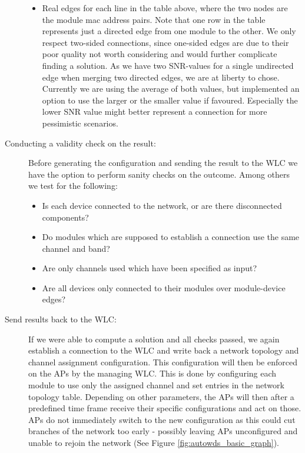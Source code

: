 \begin{description}
\begin{itemize}
	    \item Real edges for each line in the table above, where the two nodes are the module mac address pairs. 
	      Note that one row in the table represents just a directed edge from one module to the other. 
	      We only respect two-sided connections, since one-sided edges are due to their poor quality not worth considering and would further complicate finding a solution.
	      As we have two \ac{SNR}-values for a single undirected edge when merging two directed edges, we are at liberty to chose.
	      Currently we are using the average of both values, but implemented an option to use the larger or the smaller value if favoured.
	      Especially the lower \ac{SNR} value might better represent a connection for more pessimistic scenarios.
	  \end{itemize}

	\item[Conducting a validity check on the result:\newline]
	  Before generating the configuration and sending the result to the \ac{WLC} we have the option to perform sanity checks on the outcome.
	  Among others we test for the following:
	  \begin{itemize}
	    \item Is each device connected to the network, or are there disconnected components?
	    \item Do modules which are supposed to establish a connection use the same channel and band?
	    \item Are only channels used which have been specified as input?
	    \item Are all devices only connected to their modules over module-device edges?
	  \end{itemize}
	  
	\item [Send results back to the \ac{WLC}:]
	  If we were able to compute a solution and all checks passed, we again establish a connection to the \ac{WLC} and write back a network topology and channel assignment
	  configuration. This configuration will then be enforced on the APs by the managing \ac{WLC}.
	  This is done by configuring each module to use only the assigned channel and set entries in the network topology table. 
	  Depending on other parameters, the APs will then after a predefined time frame receive their specific configurations and act on those.
	  APs do not immediately switch to the new configuration as this could cut branches of the network too early - possibly leaving APs 
	  unconfigured and unable to rejoin the network (See Figure \ref{fig:autowds_basic_graph}).
	  
      \end{description}
      
